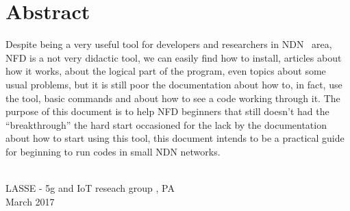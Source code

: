 \documentclass[10pt,letterpaper,extrafontsizes]{memoir}
\newcommand\svnidlong[4]{}
\begin{document}
\pagestyle{headings}

\setupshorttoc
\setupparasubsecs
\setupmaintoc
\setlength{\unitlength}{1pt}
\clearpage
\listofegresults




\svnidlong
{$Ignore: $}
{$LastChangedDate: 2014-11-05 16:28:11 +0100 (Wed, 05 Nov 2014) $}
{$LastChangedRevision: 501 $}
{$LastChangedBy: daleif $}

\chapter{Abstract}
Despite being a very useful tool for developers and researchers in NDN~\cite{ndn} area, NFD is a not very didactic tool, we can easily find how to install, articles about how it works, about the logical part of the program, even topics about some usual problems, but it is still poor the documentation about how to, in fact, use the tool, basic commands and about how to see a code working through it. The purpose of this document is to help NFD beginners that still doesn't had the ``breakthrough'' the hard start occasioned for the lack by the documentation about how to start using this tool, this document intends to be a practical guide for beginning to run codes in small NDN networks. 

{ \\ LASSE - 5g and IoT reseach group , PA \\ March 2017\par}

\svnidlong
{$Ignore: $}
{$LastChangedDate: 2015-04-22 17:17:51 +0200 (Wed, 22 Apr 2015) $}
{$LastChangedRevision: 527 $}
{$LastChangedBy: daleif $}
\end{document}
